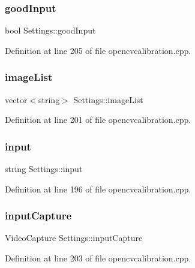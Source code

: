 \subsubsection{\texorpdfstring{goodInput}{goodInput}}
{\footnotesize\ttfamily bool Settings\+::good\+Input}



Definition at line 205 of file opencvcalibration.\+cpp.

\mbox{\label{class_settings_ae261128a69d1d3d2b0f5315aff8066c8}} 
\subsubsection{\texorpdfstring{imageList}{imageList}}
{\footnotesize\ttfamily vector$<$string$>$ Settings\+::image\+List}



Definition at line 201 of file opencvcalibration.\+cpp.

\mbox{\label{class_settings_a9970d51ab47b6560ab11b267637b6219}} 
\subsubsection{\texorpdfstring{input}{input}}
{\footnotesize\ttfamily string Settings\+::input}



Definition at line 196 of file opencvcalibration.\+cpp.

\mbox{\label{class_settings_abd5706146b34d3c32aef4025dcd2ec1b}} 
\subsubsection{\texorpdfstring{inputCapture}{inputCapture}}
{\footnotesize\ttfamily Video\+Capture Settings\+::input\+Capture}



Definition at line 203 of file opencvcalibration.\+cpp.

\mbox{\label{class_settings_a89fb14ce9856fb642f18bb0f7c5b8868}} 
